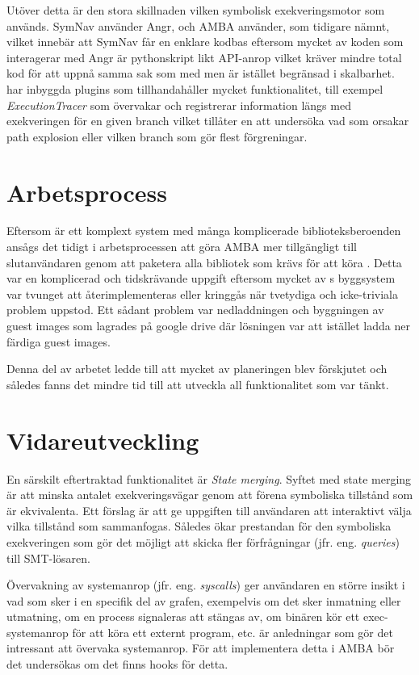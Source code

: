 Utöver detta är den stora skillnaden vilken symbolisk exekveringsmotor som
används. SymNav använder Angr, och AMBA använder, som tidigare nämnt, \stoe{}
vilket innebär att SymNav får en enklare kodbas eftersom mycket av koden som
interagerar med Angr är pythonskript likt API-anrop vilket kräver mindre total
kod för att uppnå samma sak som med \stoe{} men är istället begränsad i
skalbarhet. \stoe{} har inbyggda plugins som tillhandahåller mycket
funktionalitet, till exempel \emph{ExecutionTracer} som övervakar och
registrerar information längs med exekveringen för en given branch vilket
tillåter en att undersöka vad som orsakar path explosion eller vilken branch som
gör flest förgreningar.

\section{Arbetsprocess}
Eftersom \stoe{} är ett komplext system med många komplicerade
biblioteksberoenden ansågs det tidigt i arbetsprocessen att göra AMBA mer
tillgängligt till slutanvändaren genom att paketera alla bibliotek som krävs för
att köra \stoe{}. Detta var en komplicerad och tidskrävande uppgift eftersom
mycket av \stoe{}s byggsystem var tvunget att återimplementeras eller kringgås
när tvetydiga och icke-triviala problem uppstod. Ett sådant problem var
nedladdningen och byggningen av guest images som \stoe{} lagrades på google
drive där lösningen var att istället ladda ner färdiga guest images.

Denna del av arbetet ledde till att mycket av planeringen blev förskjutet och
således fanns det mindre tid till att utveckla all funktionalitet som var tänkt.

\section{Vidareutveckling} En särskilt eftertraktad funktionalitet är
\textit{State merging}. Syftet med state merging är att minska antalet
exekveringsvägar genom att förena symboliska tillstånd som är ekvivalenta. Ett
förslag är att ge uppgiften till användaren att interaktivt välja vilka
tillstånd som sammanfogas. Således ökar prestandan för den symboliska
exekveringen som gör det möjligt att skicka fler förfrågningar (jfr. eng.
\emph{queries}) till SMT-lösaren.

Övervakning av systemanrop (jfr. eng. \emph{syscalls}) ger användaren en större
insikt i vad som sker i en specifik del av grafen, exempelvis om det sker
inmatning eller utmatning, om en process signaleras att stängas av, om binären
kör ett exec-systemanrop för att köra ett externt program, etc. är anledningar
som gör det intressant att övervaka systemanrop. För att implementera detta i
AMBA bör det undersökas om det finns hooks för detta.

